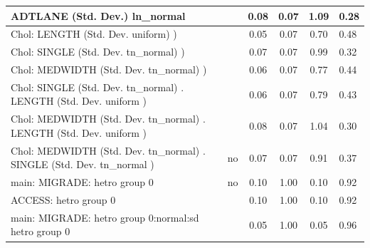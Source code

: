 \begin{table}
\begin{center}
\begin{tabular}{|l|l|c|c|c|l|}
			\hline
			ADTLANE (Std. Dev.) ln_normal &  & 0.08 & 0.07 & 1.09 & 0.28 \\
			\hline
			 Chol: LENGTH (Std. Dev. uniform) ) &  & 0.05 & 0.07 & 0.70 & 0.48 \\
			\hline
			 Chol: SINGLE (Std. Dev. tn_normal) ) &  & 0.07 & 0.07 & 0.99 & 0.32 \\
			\hline
			 Chol: MEDWIDTH (Std. Dev. tn_normal) ) &  & 0.06 & 0.07 & 0.77 & 0.44 \\
			\hline
			 Chol: SINGLE (Std. Dev. tn_normal) . LENGTH (Std. Dev.   uniform ) &  & 0.06 & 0.07 & 0.79 & 0.43 \\
			\hline
			 Chol: MEDWIDTH (Std. Dev. tn_normal) . LENGTH (Std. Dev.   uniform ) &  & 0.08 & 0.07 & 1.04 & 0.30 \\
			\hline
			 Chol: MEDWIDTH (Std. Dev. tn_normal) . SINGLE (Std. Dev.   tn_normal ) & no & 0.07 & 0.07 & 0.91 & 0.37 \\
			\hline
			main: MIGRADE: hetro group 0 & no & 0.10 & 1.00 & 0.10 & 0.92 \\
			\hline
			ACCESS: hetro group 0 &  & 0.10 & 1.00 & 0.10 & 0.92 \\
			\hline
			main: MIGRADE: hetro group 0:normal:sd  hetro group 0 &  & 0.05 & 1.00 & 0.05 & 0.96 \\
			\hline
		\end{tabular}
	\end{center}
\end{table}